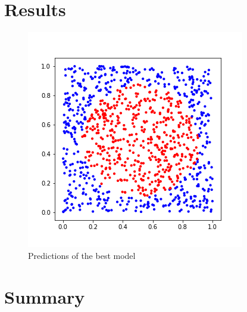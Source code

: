 \documentclass[10pt,conference]{IEEEtran}
\begin{document}
\section{Results}
\begin{figure}[h]
    \centering
    \includegraphics[scale=0.5]{../images/best_model.png}
    \caption{Predictions of the best model}
    \label{fig:best_model}
\end{figure}
\section{Summary}





\end{document}
